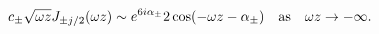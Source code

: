 \begin{equation} \label{bessel-asymp-after}
c_\pm \sqrt{\omega
z} J_{\pm j/2} (\omega z) \sim e^{6i \alpha_\pm} 2\cos (- \omega z - 
\alpha_{\pm}) \textrm{\quad as\quad} \omega z \to -\infty.
\end{equation}

